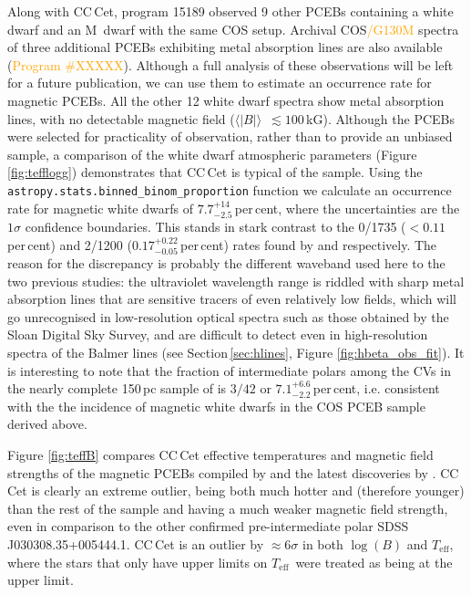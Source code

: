 \documentclass[fleqn,usenatbib]{mnras}
\newcommand{\bs}{\ensuremath{\langle \vert B \vert \rangle}}
\newcommand{\Teff}{\mbox{$T_{\mathrm{eff}}$}}
\newcommand{\bgs}[1]{\textcolor{orange}{#1}}
\begin{document}
Along with CC\,Cet, program 15189 observed 9 other PCEBs containing a white dwarf and an M~dwarf with the same COS setup. Archival COS\bgs{/G130M} spectra of three additional PCEBs exhibiting metal absorption lines are also available (\bgs{Program \#XXXXX}).  Although a full analysis of these observations will be left for a future publication, we can use them to estimate an occurrence rate for magnetic PCEBs. All the other 12 white dwarf spectra show metal absorption lines, with no detectable magnetic field (\bs\ $\lesssim100$\,kG). Although the PCEBs were selected for practicality of observation, rather than to provide an unbiased sample, a comparison of the white dwarf atmospheric parameters (Figure \ref{fig:tefflogg}) demonstrates that CC\,Cet is typical of the sample. Using the \texttt{astropy.stats.binned\_binom\_proportion} function we calculate an occurrence rate for magnetic white dwarfs of $7.7^{+14}_{-2.5}$\,per\,cent, where the uncertainties are the $1\sigma$ confidence boundaries. This stands in stark contrast to the 0/1735 ($<0.11$\,per\,cent) and 2/1200 ($0.17^{+0.22}_{-0.05}$\,per\,cent) rates found by \citet{liebertetal15-1} and \citep{silvestrietal07-1} respectively. The reason for the discrepancy is probably the different waveband used here to the two previous studies: the ultraviolet wavelength range is riddled with sharp metal absorption lines that are sensitive tracers of even relatively low fields, which will go unrecognised in low-resolution optical spectra such as those obtained by the Sloan Digital Sky Survey, and are difficult to detect even in high-resolution spectra of the Balmer lines (see Section\,\ref{sec:hlines}, Figure \ref{fig:hbeta_obs_fit}). It is interesting to note that the fraction of intermediate polars among the CVs in the nearly complete 150\,pc sample of \citet{palaetal20-1} is $3/42$ or $7.1^{+6.6}_{-2.2}$\,per\,cent, i.e. consistent with the the incidence of magnetic white dwarfs in the COS PCEB sample derived above.

Figure \ref{fig:teffB} compares CC\,Cet effective temperatures and magnetic field strengths of the magnetic PCEBs compiled by \citet{ferrarioetal15-1} and the latest discoveries by \citet{parsonsetal21-1}. CC\,Cet is clearly an extreme outlier, being both much hotter and (therefore younger) than the rest of the sample and having a much weaker magnetic field strength, even in comparison to the other confirmed pre-intermediate polar SDSS\,J030308.35+005444.1. CC\,Cet is an outlier by $\approx6\sigma$ in both $\log (B)$ and \Teff, where the stars that only have upper limits on \Teff\ were treated as being at the upper limit. 
\end{document}
